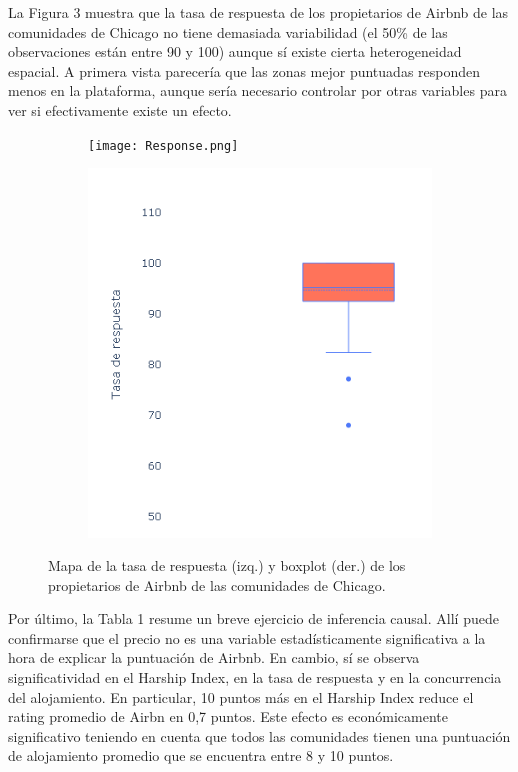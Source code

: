 \documentclass[10.5pt]{article}   %
\begin{document}
La Figura 3 muestra que la tasa de respuesta de los propietarios de Airbnb de las comunidades de Chicago no tiene demasiada variabilidad (el 50\% de las observaciones están entre 90 y 100) aunque sí existe cierta heterogeneidad espacial. A primera vista parecería que las zonas mejor puntuadas responden menos en la plataforma, aunque sería necesario controlar por otras variables para ver si efectivamente existe un efecto.

\begin{figure}[!ht]
\centering
\begin{subfigure}{.5\textwidth}
    \centering
     \textbf{}\par\medskip
    \texttt{[image: Response.png]}
    \label{fig2}
\end{subfigure}%
\begin{subfigure}{0.55\textwidth}
    \centering
     \textbf{}\par\medskip
    \includegraphics[scale=0.7]{Boxplot.png}
    \label{fig2}
\end{subfigure}%
\caption{Mapa de la tasa de respuesta (izq.) y boxplot (der.) de los propietarios de Airbnb de las comunidades de Chicago.}
\end{figure}

Por último, la Tabla 1 resume un breve ejercicio de inferencia causal. Allí puede confirmarse que el precio no es una variable estadísticamente significativa a la hora de explicar la puntuación de Airbnb. En cambio, sí se observa significatividad en el Harship Index, en la tasa de respuesta y en la concurrencia del alojamiento. En particular, 10 puntos más en el Harship Index reduce el rating promedio de Airbn en 0,7 puntos. Este efecto es económicamente significativo teniendo en cuenta que todos las comunidades tienen una puntuación de alojamiento promedio que se encuentra entre 8 y 10 puntos.
\end{document}
